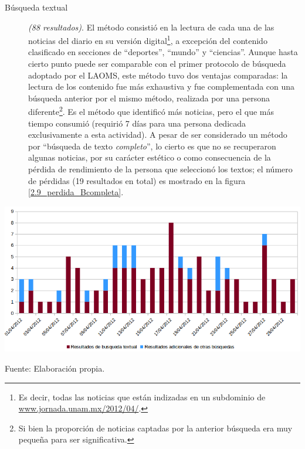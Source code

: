 \documentclass[letterpaper, 11pt]{book}
\theoremstyle{definition}
\theoremstyle{remark}
\begin{document}
\begin{description}
    \item[Búsqueda textual] \emph{(88 resultados)}. El método consistió en la lectura de cada una de las noticias del diario en su versión digital\footnote{
	Es decir, todas las noticias que están indizadas en un subdominio de \url{www.jornada.unam.mx/2012/04/}.
    }, 
    a excepción del contenido clasificado en secciones de ``deportes'', ``mundo'' y ``ciencias''. 
    Aunque hasta cierto punto puede ser comparable con el primer protocolo de búsqueda adoptado por el LAOMS, este método tuvo dos ventajas comparadas: la lectura de los contenido fue más exhaustiva y fue complementada con una búsqueda anterior por el mismo método, realizada por una persona diferente\footnote{
	Si bien la proporción de noticias captadas por la anterior búsqueda era muy pequeña para ser significativa.
    }. 
    Es el método que identificó más noticias, pero el que más tiempo consumió (requirió 7 días para una persona dedicada exclusivamente a esta actividad). 
    A pesar de ser considerado un método por ``búsqueda de texto \emph{completo}'', lo cierto es que no se recuperaron algunas noticias, por su carácter estético o como consecuencia de la pérdida de rendimiento de la persona que seleccionó los textos; el número de pérdidas (19 resultados en total) es mostrado en la figura \ref{2.9_perdida_Bcompleta}.
\end{description}
\hspace{-0.1em}\begin{minipage}{\linewidth}
\centering
{} \label{2.9_perdida_Bcompleta}
\includegraphics[scale=0.41]{img/2.9_perdida_Bcompleta.png}
\par\bigskip
\small Fuente: Elaboración propia.
\end{minipage}\bigskip
  
\end{document}
